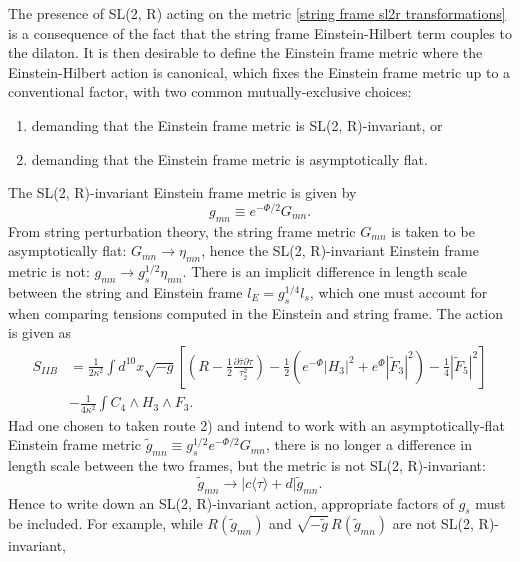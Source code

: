 {The presence of SL(2, R) acting on the metric \eqref{string frame sl2r transformations} is a consequence of the fact that the string frame Einstein-Hilbert term couples to the dilaton.
It is then desirable to define the Einstein frame metric \cite{Becker:2006dvp,Weigand:2018rez} where the Einstein-Hilbert action is canonical, which fixes the Einstein frame metric up to a conventional factor, with two common mutually-exclusive choices:
\begin{enumerate}
    \item demanding that the Einstein frame metric is SL(2, R)-invariant, or
    \item demanding that the Einstein frame metric is asymptotically flat.
\end{enumerate}
The SL(2, R)-invariant Einstein frame metric is given by
\begin{equation}
g_{mn} \equiv e^{-\Phi/2}G_{mn}.
\label{sl2r invariant Einstein frame metric}
\end{equation}
From string perturbation theory, the string frame metric $G_{mn}$ is taken to be asymptotically flat: $G_{mn} \to \eta_{mn}$, hence the SL(2, R)-invariant Einstein frame metric is not: $g_{mn} \to g_s^{1/2}\eta_{mn}$.
There is an implicit difference in length scale between the string and Einstein frame $l_E = g_s^{1/4}l_s$, which one must account for when comparing tensions computed in the Einstein and string frame.
The action is given as
\begin{equation}
\begin{aligned}
S_{IIB}
&=\frac{1}{2\kappa^2} \int d^{10}x\sqrt{-g}\left[\left(R-\frac{1}{2}\frac{\partial\bar\tau\partial\tau}{\tau_2^2}\right)
-\frac{1}{2}\left(
e^{-\Phi}|H_3|^2+e^\Phi|\tilde{F}_3|^2
\right)
-\frac{1}{4}|\tilde F_5|^2
\right]\\
&-\frac{1}{4\kappa^2}\int C_4\wedge H_3\wedge F_3.
\end{aligned}
\label{eq:sl2r_invariant_einstein_frame_action}
\end{equation}
Had one chosen to taken route 2) and intend to work with an asymptotically-flat Einstein frame metric $\tilde{g}_{mn} \equiv g_s^{1/2}e^{-\Phi/2}G_{mn}$, there is no longer a difference in length scale between the two frames, but the metric is not SL(2, R)-invariant:
\begin{equation}
\tilde{g}_{mn} \to |c\langle\tau\rangle + d| \tilde{g}_{mn}.
\end{equation}
Hence to write down an SL(2, R)-invariant action, appropriate factors of $g_s$ must be included. For example, while $R(\tilde{g}_{mn})$ and $\sqrt{-\tilde{g}}\,R(\tilde{g}_{mn})$ are not SL(2, R)-invariant, 
}
